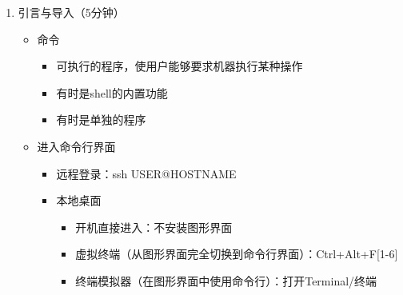 \documentclass{TIJMUjiaoanLL}
\begin{document}
\firstTail


\newpage
\otherHeader

\begin{enumerate}
  \item 引言与导入（5分钟）
    \begin{itemize}
      \item 命令
      \begin{itemize}
        \item 可执行的程序，使用户能够要求机器执行某种操作
        \item 有时是shell的内置功能
        \item 有时是单独的程序
      \end{itemize}
      \item 进入命令行界面
	\begin{itemize}
	  \item 远程登录：ssh USER@HOSTNAME
	  \item 本地桌面
	    \begin{itemize}
	      \item 开机直接进入：不安装图形界面
	      \item 虚拟终端（从图形界面完全切换到命令行界面）：Ctrl+Alt+F[1-6]
	      \item 终端模拟器（在图形界面中使用命令行）：打开Terminal/终端
	    \end{itemize}
	\end{itemize}
    \end{itemize}


\end{enumerate}
\end{document}
